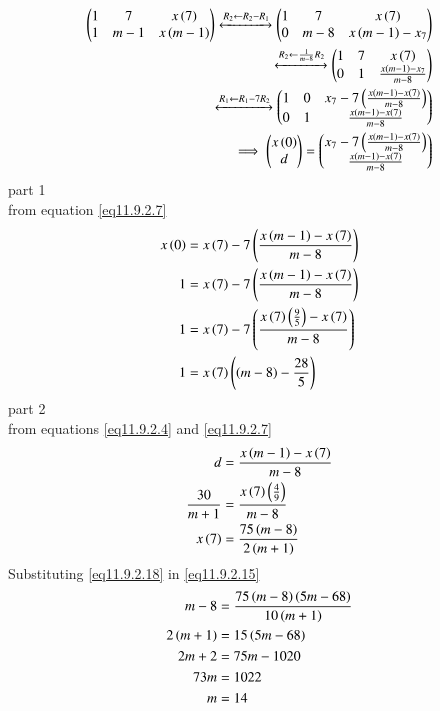 \documentclass[journal,12pt,twocolumn]{IEEEtran}
\theoremstyle{remark}
\begin{document}
\begin{align}
 \begin{pmatrix}
   1 & 7 & x\left(7\right)
   \\
   1 & m-1 & x\left(m-1\right)
 \end{pmatrix}
 \xleftrightarrow[]{R_2 \leftarrow {R_2-R_1}}
 \begin{pmatrix}
   1 & 7 & x\left(7\right)
   \\
   0 & m-8 & x\left(m-1\right)-x_7
 \end{pmatrix}
 \\
 \xleftrightarrow[]{R_2 \leftarrow {\frac{1}{m-8}R_2}}
 \begin{pmatrix}
   1 & 7 & x\left(7\right)
   \\
   0 & 1 & \frac{x\left(m-1\right)-x_7}{m-8}
 \end{pmatrix}
 \\
 \xleftrightarrow[]{R_1 \leftarrow {R_1-7{R_2}}}
 \begin{pmatrix}
   1 & 0 & x_7-7\left(\frac{x\left(m-1\right)-x\left(7\right)}{m-8}\right)
   \\
   0 & 1 & \frac{x\left(m-1\right)-x\left(7\right)}{m-8}
 \end{pmatrix}
 \\
 \implies \begin{pmatrix}
   x\left(0\right)
   \\
   d
 \end{pmatrix}
 =
 \begin{pmatrix}
   x_7-7\left(\frac{x\left(m-1\right)-x\left(7\right)}{m-8}\right)
   \\
   \frac{x\left(m-1\right)-x\left(7\right)}{m-8}
 \end{pmatrix}
\end{align}
part 1\\
from equation \eqref{eq11.9.2.7}\\
\begin{align}
    x\left(0\right)&=x\left(7\right)-7\left(\frac{x\left(m-1\right)-x\left(7\right)}{m-8}\right)\\
    1&=x\left(7\right)-7\left(\frac{x\left(m-1\right)-x\left(7\right)}{m-8}\right)\\
    1&=x\left(7\right)-7\left(\frac{x\left(7\right)\left(\frac{9}{5}\right)-x\left(7\right)}{m-8}\right)\\
    1&=x\left(7\right)\left(\left(m-8\right)-\frac{28}{5}\right) \label{eq11.9.2.15}
\end{align}
part 2\\
from equations \eqref{eq11.9.2.4} and \eqref{eq11.9.2.7}\\
 \begin{align}
    d&=\frac{x\left(m-1\right)-x\left(7\right)}{m-8}\\
    \frac{30}{m+1}&=\frac{x\left(7\right)\left(\frac{4}{9}\right)}{m-8}\\ \label{eq11.9.2.18}
    x\left(7\right)&=\frac{75\left(m-8\right)}{2\left(m+1\right)}
 \end{align}
Substituting \eqref{eq11.9.2.18} in \eqref{eq11.9.2.15}\\
 \begin{align}
    m-8&=\frac{75\left(m-8\right)\left(5m-68\right)}{10\left(m+1\right)}\\
    2\left(m+1\right)&=15\left(5m-68\right)\\
    2m+2&=75m-1020\\
    73m&=1022\\
    m&=14
 \end{align}
\end{document}
